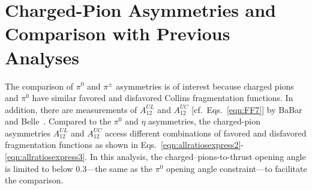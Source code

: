 \section{\texorpdfstring{Charged-Pion Asymmetries and Comparison with Previous Analyses}{Comparison with Previous Analyses}}
\label{sec:comparewpreviouse}

The comparison of $\pi^0$ and $\pi^{\pm}$ asymmetries is of interest because charged pions and $\pi^0$ have similar favored and disfavored Collins fragmentation functions. 
In addition, there are measurements of $A^{UL}_{12}$ and $A^{UC}_{12}$ [cf.~Eqs.~\eqref{eqn:FF7}] by BaBar~\cite{BabarCharged} and Belle~\cite{ChargedPionResult2,ChargedPionResult}. 
Compared to the $\pi^0$ and $\eta$ asymmetries, the charged-pion asymmetries $A^{UL}_{12}$ and $A^{UC}_{12}$ access different combinations of favored and disfavored fragmentation functions as shown in Eqs.~\eqref{eqn:allratiosexpress2}-\eqref{eqn:allratiosexpress3}. In this analysis, the charged--pions-to-thrust opening angle is limited to below 0.3---the same as the $\pi^0$ opening angle constraint---to facilitate the comparison.

%


